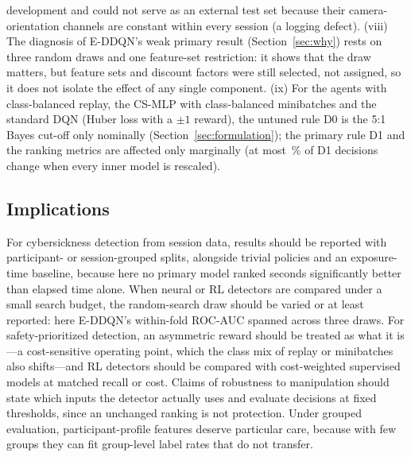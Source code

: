 development and could not serve as an external test set because their camera-orientation channels are constant within every session (a logging defect). (viii) The diagnosis of E-DDQN's weak primary result (Section~\ref{sec:why}) rests on three random draws and one feature-set restriction: it shows that the draw matters, but feature sets and discount factors were still selected, not assigned, so it does not isolate the effect of any single component. (ix) For the agents with class-balanced replay, the CS-MLP with class-balanced minibatches and the standard DQN (Huber loss with a $\pm1$ reward), the untuned rule D0 is the 5:1 Bayes cut-off only nominally (Section~\ref{sec:formulation}); the primary rule D1 and the ranking metrics are affected only marginally (at most \SSSensMaxChanged\,\% of D1 decisions change when every inner model is rescaled).

\subsection{Implications}
For cybersickness detection from session data, results should be reported with participant- or session-grouped splits, alongside trivial policies and an exposure-time baseline, because here no primary model ranked seconds significantly better than elapsed time alone. When neural or RL detectors are compared under a small search budget, the random-search draw should be varied or at least reported: here E-DDQN's within-fold ROC-AUC spanned \SDWfSpan{} across three draws. For safety-prioritized detection, an asymmetric reward should be treated as what it is---a cost-sensitive operating point, which the class mix of replay or minibatches also shifts---and RL detectors should be compared with cost-weighted supervised models at matched recall or cost. Claims of robustness to manipulation should state which inputs the detector actually uses and evaluate decisions at fixed thresholds, since an unchanged ranking is not protection. Under grouped evaluation, participant-profile features deserve particular care, because with few groups they can fit group-level label rates that do not transfer.

